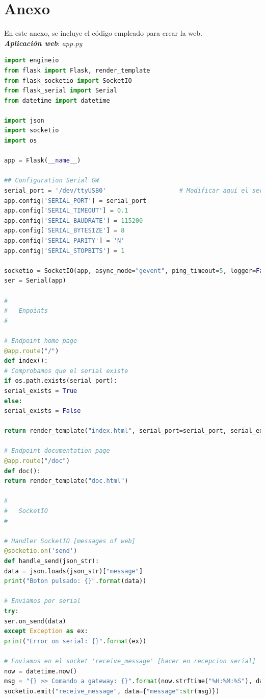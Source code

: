\documentclass[12pt]{article}
\begin{document}
	\pagebreak
	
	\section*{Anexo}
	\label{anexo: codigo}
	
	\noindent En este anexo, se incluye el código empleado para crear la web. \\
	
	\noindent \textit{\textbf{Aplicación web}}: \textit{app.py}\\
	
	\begin{lstlisting}[language=python]
import engineio
from flask import Flask, render_template
from flask_socketio import SocketIO
from flask_serial import Serial
from datetime import datetime

import json
import socketio
import os

app = Flask(__name__)

## Configuration Serial GW
serial_port = '/dev/ttyUSB0'                    # Modificar aqui el serial del Arduino, lo dice el IDE
app.config['SERIAL_PORT'] = serial_port
app.config['SERIAL_TIMEOUT'] = 0.1
app.config['SERIAL_BAUDRATE'] = 115200
app.config['SERIAL_BYTESIZE'] = 8
app.config['SERIAL_PARITY'] = 'N'
app.config['SERIAL_STOPBITS'] = 1

socketio = SocketIO(app, async_mode="gevent", ping_timeout=5, logger=False, engineio_logger=False)
ser = Serial(app)

#
#   Enpoints
#

# Endpoint home page
@app.route("/")
def index():
# Comprobamos que el serial existe
if os.path.exists(serial_port):
serial_exists = True
else:
serial_exists = False

return render_template("index.html", serial_port=serial_port, serial_exists=serial_exists)

# Endpoint documentation page
@app.route("/doc")
def doc():
return render_template("doc.html")

#
#   SocketIO
#

# Handler SocketIO [messages of web]
@socketio.on('send')
def handle_send(json_str):
data = json.loads(json_str)["message"]
print("Boton pulsado: {}".format(data))

# Enviamos por serial
try:
ser.on_send(data)
except Exception as ex:
print("Error on serial: {}".format(ex))

# Enviamos en el socket 'receive_message' [hacer en recepcion serial]
now = datetime.now()
msg = "{} >> Comando a gateway: {}".format(now.strftime("%H:%M:%S"), data)
socketio.emit("receive_message", data={"message":str(msg)})


\end{lstlisting}
\end{document}

